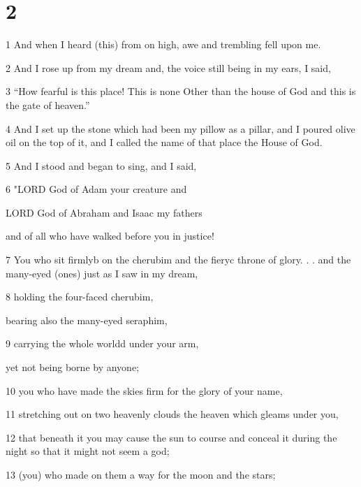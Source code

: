 \chapter{2}

\par 1 And when I heard (this) from on high, awe and trembling fell upon me. 

\par 2 And I rose up from my dream and, the voice still being in my ears, I said,

\par 3 “How fearful is this place! This is none Other than the house of God and this is the gate of heaven.” 

\par 4 And I set up the stone which had been my pillow as a pillar, and I poured olive oil on the top of it, and I called the name of that place the House of God. 

\par 5 And I stood and began to sing, and I said, 

\par 6 "LORD God of Adam your creature and
\par LORD God of Abraham and Isaac my fathers
\par and of all who have walked before you in justice!

\par 7 You who sit firmlyb on the cherubim and the fieryc throne of glory. . . and the many-eyed (ones) just as I saw in my dream,

\par 8 holding the four-faced cherubim,
\par bearing also the many-eyed seraphim,

\par 9 carrying the whole worldd under your arm,
\par yet not being borne by anyone;

\par 10 you who have made the skies firm for the glory of your name,

\par 11 stretching out on two heavenly clouds the heaven which gleams under you,

\par 12 that beneath it you may cause the sun to course and conceal it during the night so that it might not seem a god;

\par 13 (you) who made on them a way for the moon and the stars;

